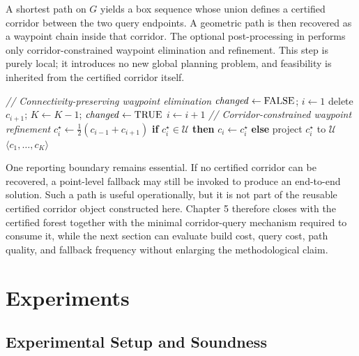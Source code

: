 \documentclass[journal]{IEEEtran}
\DeclareRobustCommand{\textsc}[1]{\textnormal{\MakeUppercase{#1}}}
\begin{document}
A shortest path on $G$ yields a box sequence whose union defines a certified
corridor between the two query endpoints. A geometric path is then recovered as
a waypoint chain inside that corridor. The optional post-processing in
 performs only corridor-constrained waypoint
elimination and refinement. This step is purely local; it introduces no new
global planning problem, and feasibility is inherited from the certified
corridor itself.

\begin{algorithm}[t]
\caption{Lightweight corridor cleanup (\textsc{PathOpt})}
\label{alg:pathopt_rewrite}
\footnotesize
\begin{algorithmic}[1]
\STATE \textit{// Connectivity-preserving waypoint elimination}
\REPEAT
  \STATE $\mathit{changed} \gets \textsc{false}$; $i \gets 1$
      \STATE delete $c_{i+1}$; $K \gets K-1$; $\mathit{changed} \gets \textsc{true}$
    \ELSE
      \STATE $i \gets i+1$
    \ENDIF
  \ENDWHILE
{}
\STATE \textit{// Corridor-constrained waypoint refinement}
  \STATE $c_i^\star \gets \tfrac{1}{2}(c_{i-1}+c_{i+1})$
  \STATE \textbf{if} $c_i^\star \in \mathcal{U}$ \textbf{then} $c_i \gets c_i^\star$
  \STATE \textbf{else} project $c_i^\star$ to $\mathcal{U}$
\ENDFOR
\STATE \RETURN $\langle c_1,\dots,c_K\rangle$
\end{algorithmic}
\end{algorithm}

One reporting boundary remains essential. If no certified corridor can be
recovered, a point-level fallback may still be invoked to produce an end-to-end
solution. Such a path is useful operationally, but it is not part of the
reusable certified corridor object constructed here. Chapter 5 therefore closes
with the certified forest together with the minimal corridor-query mechanism
required to consume it, while the next section can evaluate build cost, query
cost, path quality, and fallback frequency without enlarging the
methodological claim.

\section{Experiments}\label{sec:exp}

\subsection{Experimental Setup and Soundness}\label{sec:exp_setup_sound}
\end{document}

